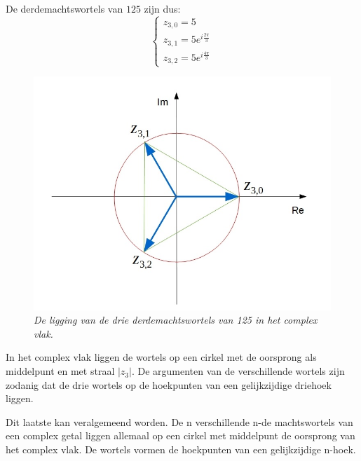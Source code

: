 \begin{enumerate}
	De derdemachtswortels van $125$ zijn dus:\\
	
	\[  \left\{  \begin{array}{l}
	z_{3,0}=5 \\ z_{3,1}=5e^{i\frac{2\pi}{3}} \\ z_{3,2}=5e^{i\frac{4\pi}{3}} \end{array} \right.	
	\]
	
	\begin{figure}[ht]
		\begin{center}
			\includegraphics[scale=0.6]{3_gonio_complexe_getallen/inputs/derdemachtswortels-voorbeeld.jpg}
		\end{center}
		\caption{\it De ligging van de drie derdemachtswortels van 125 in het complex vlak.}
	\end{figure}
	
	In het complex vlak liggen de wortels op een cirkel met de oorsprong als middelpunt en met straal $|z_{3}|$. De argumenten van de verschillende wortels zijn zodanig dat de drie wortels op de hoekpunten van een gelijkzijdige driehoek liggen.\\
	
\end{enumerate}

Dit laatste kan veralgemeend worden. De n verschillende n-de machtswortels van een complex getal liggen allemaal op een cirkel met middelpunt de oorsprong van het complex vlak. De wortels vormen de hoekpunten van een gelijkzijdige n-hoek.\\

